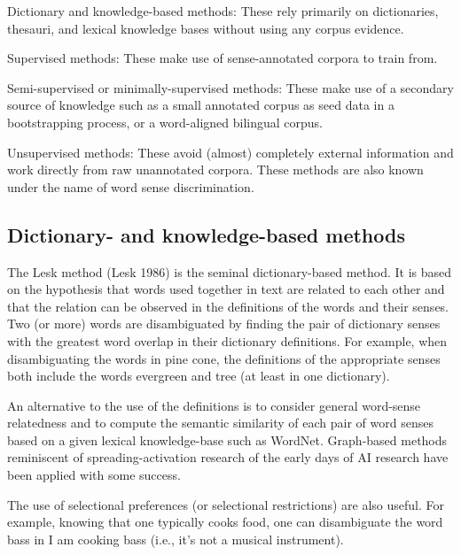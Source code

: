 \documentclass[11pt]{article}
\begin{document}
Dictionary and knowledge-based methods: These rely primarily on dictionaries, thesauri, and lexical knowledge bases without using any corpus evidence.

Supervised methods: These make use of sense-annotated corpora to train from.

Semi-supervised or minimally-supervised methods: These make use of a secondary source of knowledge such as a small annotated corpus as seed data in a bootstrapping process, or a word-aligned bilingual corpus.

Unsupervised methods: These avoid (almost) completely external information and work directly from raw unannotated corpora. These methods are also known under the name of word sense discrimination.




\subsection{Dictionary- and knowledge-based methods}

The Lesk method (Lesk 1986) is the seminal dictionary-based method. It is based on the hypothesis that words used together in text are related to each other and that the relation can be observed in the definitions of the words and their senses. Two (or more) words are disambiguated by finding the pair of dictionary senses with the greatest word overlap in their dictionary definitions. For example, when disambiguating the words in pine cone, the definitions of the appropriate senses both include the words evergreen and tree (at least in one dictionary).

An alternative to the use of the definitions is to consider general word-sense relatedness and to compute the semantic similarity of each pair of word senses based on a given lexical knowledge-base such as WordNet. Graph-based methods reminiscent of spreading-activation research of the early days of AI research have been applied with some success.

The use of selectional preferences (or selectional restrictions) are also useful. For example, knowing that one typically cooks food, one can disambiguate the word bass in I am cooking bass (i.e., it's not a musical instrument).

\nocite{Chali:2007:UWS:1621474.1621580,Liu:2005:WSD:1099554.1099696,Prithviraj04softword,Zouaghi:2012:CIR:2400491.2400493}
\printbibliography
\endrefsection
\end{document}
